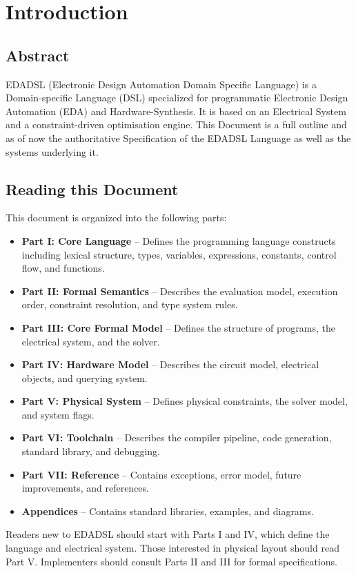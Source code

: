 \chapter{Introduction}
\section{Abstract}
EDADSL (Electronic Design Automation Domain Specific Language) is a Domain-specific Language (DSL) specialized for programmatic Electronic Design Automation (EDA) and Hardware-Synthesis. 
It is based on an Electrical System and a constraint-driven optimisation engine.
This Document is a full outline and as of now the authoritative Specification of the EDADSL Language as well as the systems underlying it.

\section{Reading this Document}
This document is organized into the following parts:

\begin{itemize}
\item \textbf{Part I: Core Language} -- Defines the programming language constructs including lexical structure, types, variables, expressions, constants, control flow, and functions.
\item \textbf{Part II: Formal Semantics} -- Describes the evaluation model, execution order, constraint resolution, and type system rules.
\item \textbf{Part III: Core Formal Model} -- Defines the structure of programs, the electrical system, and the solver.
\item \textbf{Part IV: Hardware Model} -- Describes the circuit model, electrical objects, and querying system.
\item \textbf{Part V: Physical System} -- Defines physical constraints, the solver model, and system flags.
\item \textbf{Part VI: Toolchain} -- Describes the compiler pipeline, code generation, standard library, and debugging.
\item \textbf{Part VII: Reference} -- Contains exceptions, error model, future improvements, and references.
\item \textbf{Appendices} -- Contains standard libraries, examples, and diagrams.
\end{itemize}

Readers new to EDADSL should start with Parts I and IV, which define the language and electrical system. Those interested in physical layout should read Part V. Implementers should consult Parts II and III for formal specifications.


